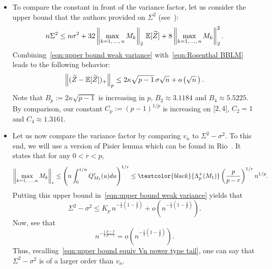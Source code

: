 \documentclass[10pt]{amsart}
\theoremstyle{definition}\newtheorem{defi}[theo]{Definition}\newtheorem{rema}[theo]{Remark}\newtheorem{exam}[theo]{Example}\newtheorem{exem}[theo]{Example}\newtheorem{nota}[theo]{Notation}
\newcommand{\bE}{\mathbb{E}}
\newcommand{\intervalleff}[2]{\mathopen{[} #1\mathclose{}\mathpunct{},#2\mathclose{]}}
\let\oldtilde\tilde
\renewcommand*{\tilde}[1]{\mathchoice{\widetilde{#1}}{\widetilde{#1}}{\oldtilde{#1}}{\oldtilde{#1}}}
\begin{document}
\begin{itemize}
\item To compare the constant in front of the variance factor, let us consider the upper bound that the authors provided on $\Sigma^2$ (see~\cite[Theorem~11.17]{BLM13}):
\begin{equation}\label{eqn:upper bound weak variance}
n\Sigma^2\leq n\sigma^2+32\left\|\max_{k=1,\,\ldots,\,n}M_k\right\|_2\,\bE[\tilde Z]+8\left\|\max_{k=1,\,\ldots,\,n}M_k\right\|_2^2.
\end{equation}
\goodbreak
Combining~\eqref{eqn:upper bound weak variance} with~\eqref{eqn:Rosenthal BBLM} leads to the following behavior:
\begin{equation}\label{eqn:Rosenthal BBLM moderate deviation}
\left\|(\tilde Z-\bE[\tilde Z])_+\right\|_p\leq 2\kappa\sqrt{p-1}\,\sigma\sqrt n+o\left(\sqrt n\,\right).
\end{equation}
Note that $B_p:= 2\kappa\sqrt{p-1}$ is increasing in $p$, $B_2\approx 3.1184$ and $B_4\approx 5.5225$. By comparison, our constant $C_p:=(p-1)^{1/p}$ is increasing on $\intervalleff 24$, $C_2= 1$ and $C_4\approx 1.3161$.
\item Let us now compare the variance factor by comparing $v_n$ to $\Sigma^2-\sigma^2$. To this end, we will use a version of Pisier lemma which can be found in Rio~\cite[Appendix D]{Rio17b}. It states that for any $0<r< p$,
\begin{equation}\label{eqn:Pisier lemma}
\left\|\max_{k=1,\,\ldots,\,n}M_k\right\|_r\leq \left(n\int_0^{1/n}Q_{M_1}^r(u)du\right)^{1/r}\leq \textcolor{black}{\Lambda_p^+(M_1)} \left(\frac{p}{p-r}\right)^{1/r}n^{1/p}.
\end{equation}
Putting this upper bound in~\eqref{eqn:upper bound weak variance} yields that
\[
\Sigma^2-\sigma^2\leq K_p\, n^{-\frac 12\left(1-\frac{2}{p}\right)}+o\left(n^{-\frac{1}{2}\left(1-\frac{2}{p}\right)}\right).
\]
Now, see that
\[
n^{-\frac{1}{2}\frac{p-2}{p-1}}=o\left(n^{-\frac{1}{2}\left(1-\frac{2}{p}\right)}\right).
\]
Thus, recalling~\eqref{eqn:upper bound equiv Vn power type tail}, one can say that $\Sigma^2-\sigma^2$ is of a larger order than $v_n$.
\end{itemize}
\end{document}
